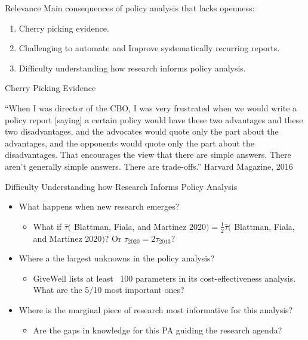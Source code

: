 \documentclass{beamer}
\begin{document}
\begin{frame}{Relevance}
Main consequences of policy analysis that lacks openness:
\begin{enumerate}
\item Cherry picking evidence.
\item Challenging to automate and Improve systematically recurring reports.
\item Difficulty understanding how research informs policy analysis.
\end{enumerate}
\end{frame}

\begin{frame}{Cherry Picking Evidence}
\pause
\begin{exampleblock}{}
  {\large ``When I was director of the CBO, I was very frustrated when we would write a policy report [saying] a certain policy would have these two advantages and these two disadvantages, and the advocates would quote only the part about the advantages, and the opponents would quote only the part about the disadvantages. That encourages the view that there are simple answers. There aren't generally simple answers. There are trade-offs.''
}
  \vskip3mm
   \footnotesize{ \linebreak  Harvard Magazine, 2016} 
  	  
\end{exampleblock}
\end{frame} 




\begin{frame}{Difficulty Understanding how Research Informs Policy Analysis}
\begin{itemize}
\item What happens when new research emerges?
\begin{itemize}
\item What if $\hat{\tau}($ Blattman, Fiala, and Martinez 2020$) = \frac{1}{2}\hat{\tau}($ Blattman, Fiala, and Martinez 2020$)$? Or $\tau_{2020} = 2\tau_{2013}$?
\end{itemize}
\pause
\item Where a the largest unknowns in the policy analysis?
\begin{itemize}
\item GiveWell lists at least ~100 parameters in its cost-effectiveness analysis. What are the 5/10 most important ones?
\end{itemize}
\pause
\item Where is the marginal piece of research most informative for this analysis?
\begin{itemize}
\item Are the gaps in knowledge for this PA guiding the research agenda?
\end{itemize}
\end{itemize}
\end{frame} 
\end{document}
